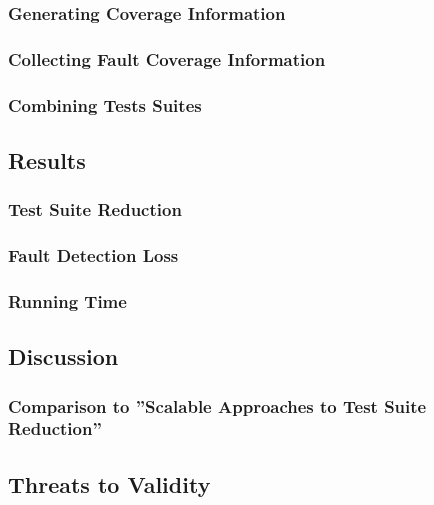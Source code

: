 \documentclass[a4paper,10pt]{article}
\begin{document}

\subsubsection{Generating Coverage Information}


\subsubsection{Collecting Fault Coverage Information}


\subsubsection{Combining Tests Suites}

\subsection{Results}

\subsubsection{Test Suite Reduction}

\subsubsection{Fault Detection Loss}

\subsubsection{Running Time}

\subsection{Discussion}

\subsubsection{Comparison to ''Scalable Approaches to Test Suite Reduction''}

\subsection{Threats to Validity}
\end{document}
